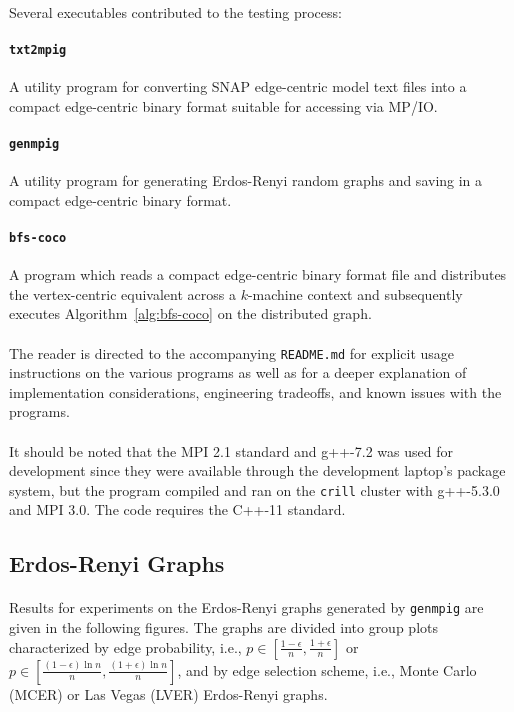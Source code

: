 \documentclass[11pt,epsf]{article}
\begin{document}
{{    \paragraph{}{
      Several executables contributed to the testing process:
    }
    \paragraph{\texttt{txt2mpig}}{
      A utility program for converting SNAP edge-centric model text files
      into a compact edge-centric binary format suitable for accessing via MP/IO.
    }
    \paragraph{\texttt{genmpig}}{
      A utility program for generating Erdos-Renyi random graphs and saving
      in a compact edge-centric binary format.
    }
    \paragraph{\texttt{bfs-coco}}{
      A program which reads a compact edge-centric binary format file and
      distributes the vertex-centric equivalent across a $k$-machine context
      and subsequently executes Algorithm~\ref{alg:bfs-coco} on the distributed graph.
    }
    \paragraph{}{
      The reader is directed to the accompanying \texttt{README.md} for
      explicit usage instructions on the various programs as well as
      for a deeper explanation of implementation considerations,
      engineering tradeoffs, and known issues with the programs.
    }
    \paragraph{}{
      It should be noted that the MPI 2.1 standard\autocite{MPI21} and g++-7.2
      was used for development since they were available through the development
      laptop's package system, but the program compiled and ran on the \texttt{crill}
      cluster with g++-5.3.0 and MPI 3.0. The code requires the C++-11 standard.
    }
  }

  \subsection{Erdos-Renyi Graphs}{
    \paragraph{}{
      Results for experiments on the Erdos-Renyi graphs generated by \texttt{genmpig}
      are given in the following figures. The graphs are divided into group plots characterized
      by edge probability, i.e., $p \in [\frac{1-\epsilon}{n}, \frac{1+\epsilon}{n}]$ or
      $p \in [\frac{(1-\epsilon)\ln n}{n}, \frac{(1+\epsilon)\ln n}{n}]$, and by
      edge selection scheme, i.e., Monte Carlo (MCER) or Las Vegas (LVER) Erdos-Renyi graphs.
    }
}}
\end{document}
